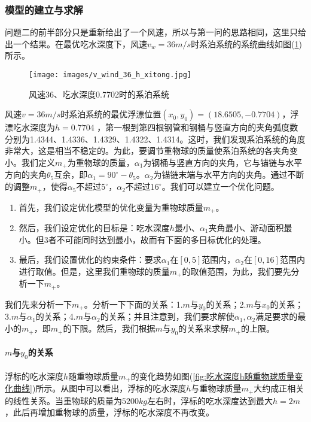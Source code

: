         \subsubsection{模型的建立与求解}
            \par
            问题二的前半部分只是重新给出了一个风速，所以与第一问的思路相同，这里只给出一个结果。在最优吃水深度下，风速$v_w=36m/s$时系泊系统的系统曲线如图(\ref{风速36、吃水深度0.7702时的系泊系统})所示。
            \begin{figure}[H]
                \centering
                \texttt{[image: images/v\_wind\_36\_h\_xitong.jpg]}
                \caption{风速36、吃水深度0.7702时的系泊系统}
                \label{风速36、吃水深度0.7702时的系泊系统}
            \end{figure}
            \par
            风速$v=36m/s$时系泊系统的最优浮漂位置$(x_0,y_0) = (18.6505,-0.7704)$，浮漂吃水深度为$h = 0.7704$ ，第一根到第四根钢管和钢桶与竖直方向的夹角弧度数分别为1.4344、1.4336、1.4329、1.4322、1.4314。这时，我们发现系泊系统的角度非常大，这是相当不稳定的。为此，要调节重物球的质量使系泊系统的各夹角变小。我们定义$m_+$为重物球的质量，$\alpha_1$为钢桶与竖直方向的夹角，它与锚链与水平方向的夹角$\theta_5$互余，即$\alpha_1 = 90^\circ - \theta_5$。$\alpha_2$为锚链末端与水平方向的夹角。通过不断的调整$m_+$，使得$\alpha_5$不超过$5^\circ$，$\alpha_2$不超过$16^\circ$。我们可以建立一个优化问题。
            \par
            \begin{enumerate}
            \item 首先，我们设定优化模型的优化变量为重物球质量$m_+$。
            \item 然后，我们设定优化的目标是：吃水深度$h$最小、$\alpha_1$夹角最小、游动面积最小。但3者不可能同时达到最小，故而有下面的多目标优化的处理。
            \item 最后，我们设置优化的约束条件：要求$\alpha_1$在$[0,5]$范围内，$\alpha_2$在$[0,16]$范围内进行取值。但是，这里我们重物球的质量$m_+$的取值范围，为此，我们要先分析一下$m_+$。
            \end{enumerate}
            \par
            我们先来分析一下$m_+$。分析一下下面的关系：1.$m$与$y_0$的关系；2.$m$与$x_0$的关系；3.$m$与$\alpha_1$的关系；4.$m$与$\alpha_2$的关系；并且注意到，我们要求解使$\alpha_1,\alpha_2$满足要求的最小的$m_+$，即$m_+$的下限。然后，我们根据$m$与$y_0$的关系来求解$m_+$的上限。
            \paragraph{$m$与$y_0$的关系}浮标的吃水深度$h$随重物球质量$m_+$的变化趋势如图(\ref{fig:吃水深度h随重物球质量变化曲线})所示。从图中可以看出，浮标的吃水深度$h$与重物球质量$m_+$大约成正相关的线性关系。当重物球的质量为$5200kg$左右时，浮标的吃水深度达到最大$h=2m$，此后再增加重物球的质量，浮标的吃水深度不再改变。
